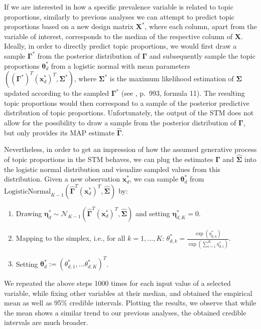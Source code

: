 If we are interested in how a specific prevalence variable is related to topic proportions, similarly to previous analyses we can attempt to predict topic proportions based on a new design matrix $\boldsymbol{X}^*$, where each column, apart from the variable of interest, corresponds to the median of the respective column of $\boldsymbol{X}$. Ideally, in order to directly predict topic proportions, we would first draw a sample $\boldsymbol{\Gamma}^*$ from the posterior distribution of $\boldsymbol{\Gamma}$ and subsequently sample the topic proportions $\boldsymbol{\theta}_d^*$ from a logistic normal with mean parameters $((\boldsymbol{\Gamma}^*)^T (\boldsymbol{x}_d^*)^T, \boldsymbol{\Sigma}^*)$, where $\boldsymbol{\Sigma}^*$ is the maximum likelihood estimation of $\boldsymbol{\Sigma}$ updated according to the sampled $\boldsymbol{\Gamma}^*$ (see \citealp{roberts2016model}, p.\ 993, formula 11). The resulting topic proportions would then correspond to a sample of the posterior predictive distribution of topic proportions. Unfortunately, the output of the STM does not allow for the possibility to draw a sample from the posterior distribution of $\boldsymbol{\Gamma}$, but only provides its MAP estimate $\hat{\boldsymbol{\Gamma}}$. 

Nevertheless, in order to get an impression of how the assumed generative process of topic proportions in the STM behaves, we can plug the estimates $\hat{\boldsymbol{\Gamma}}$ and $\hat{\boldsymbol{\Sigma}}$ into the logistic normal distribution and visualize sampled values from this distribution. Given a new observation $\boldsymbol{x}_d^*$, we can sample $\boldsymbol{\theta}_d^*$ from $\text{LogisticNormal}_{K-1}(\hat{\boldsymbol{\Gamma}}^T(\boldsymbol{x}_d^*)^T, \hat{\boldsymbol{\Sigma}})$ by:

\begin{enumerate}
\item Drawing $\boldsymbol{\eta}_d^* \sim \mathcal{N}_{K-1}(\hat{\boldsymbol{\Gamma}}^T(\boldsymbol{x}_d^*)^T, \hat{\boldsymbol{\Sigma}})$ and setting $\boldsymbol{\eta}^*_{d,K} = 0$.
\item Mapping to the simplex, i.e., for all $k = 1,\dots,K$: $\theta_{d,k}^* = \frac{\exp(\eta^*_{d,k})}{\exp(\sum_{i=1}^{K} \eta^*_{d,i})}$.
\item Setting $\boldsymbol{\theta}_d^* := (\theta_{d,1}^*, \dots \theta_{d,K}^*)^T$.
\end{enumerate}

We repeated the above steps 1000 times for each input value of a selected variable, while fixing other variables at their median, and obtained the empirical mean as well as 95\% credible intervals. Plotting the results, we observe that while the mean shows a similar trend to our previous analyses, the obtained credible intervals are much broader.

